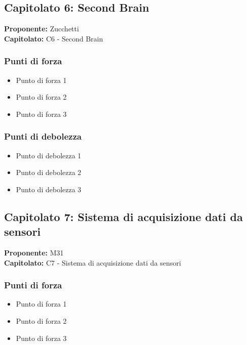 \documentclass[a4paper,12pt]{article}
\begin{document}
\subsection{Capitolato 6: Second Brain}

\begin{tcolorbox}[colback=lightgray!30,colframe=darkgray,arc=2mm,boxrule=0.3pt]
\textbf{Proponente:} Zucchetti \\
\textbf{Capitolato:} C6 - Second Brain
\end{tcolorbox}

\subsubsection{Punti di forza}
\begin{itemize}
\item Punto di forza 1
\item Punto di forza 2
\item Punto di forza 3
\end{itemize}

\subsubsection{Punti di debolezza}
\begin{itemize}
\item Punto di debolezza 1
\item Punto di debolezza 2
\item Punto di debolezza 3
\end{itemize}

\subsection{Capitolato 7: Sistema di acquisizione dati da sensori}

\begin{tcolorbox}[colback=lightgray!30,colframe=darkgray,arc=2mm,boxrule=0.3pt]
\textbf{Proponente:} M31 \\
\textbf{Capitolato:} C7 - Sistema di acquisizione dati da sensori
\end{tcolorbox}

\subsubsection{Punti di forza}
\begin{itemize}
\item Punto di forza 1
\item Punto di forza 2
\item Punto di forza 3
\end{itemize}
\end{document}

